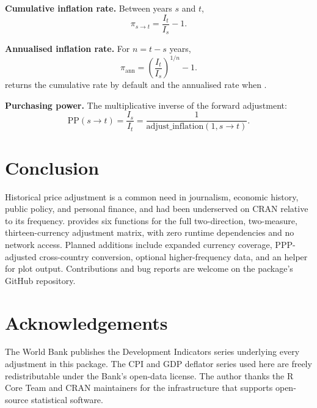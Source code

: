 \textbf{Cumulative inflation rate.} Between years \(s\) and \(t\),
\[\pi_{s \to t} = \frac{I_t}{I_s} - 1.\]

\textbf{Annualised inflation rate.} For \(n = t - s\) years,
\[\pi_{\mathrm{ann}} = \left(\frac{I_t}{I_s}\right)^{1/n} - 1.\]
 returns the cumulative rate by default
and the annualised rate when .

\textbf{Purchasing power.} The multiplicative inverse of the forward
adjustment:
\[\mathrm{PP}(s \to t) = \frac{I_s}{I_t}
  = \frac{1}{\mathrm{adjust\_inflation}(1, s \to t)}.\]

\section{Conclusion}\label{conclusion}

Historical price adjustment is a common need in journalism,
economic history, public policy, and personal finance, and had
been underserved on CRAN relative to its frequency.
 provides six functions for the full
two-direction, two-measure, thirteen-currency adjustment matrix,
with zero runtime dependencies and no network access. Planned
additions include expanded currency coverage, PPP-adjusted
cross-country conversion, optional higher-frequency data, and an
 helper for plot output. Contributions
and bug reports are welcome on the package's GitHub repository.

\section*{Acknowledgements}\label{acknowledgements}

The World Bank publishes the Development Indicators series
underlying every adjustment in this package. The CPI and GDP
deflator series used here are freely redistributable under the
Bank's open-data license. The author thanks the R Core Team and
CRAN maintainers for the infrastructure that supports open-source
statistical software.



\address{%
Charles Coverdale\\
Independent\\%
London, United Kingdom\\
%
\url{https://github.com/charlescoverdale/inflateR}\\%
%
\href{mailto:charles.f.coverdale@gmail.com}{\nolinkurl{charles.f.coverdale@gmail.com}}%
}
